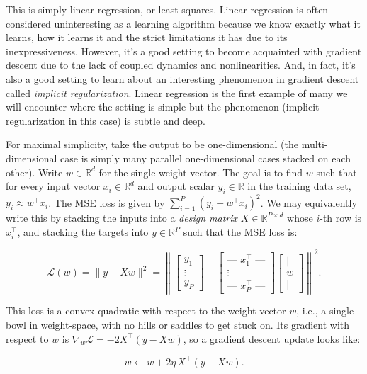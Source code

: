 This is simply linear regression, or least squares. Linear regression is often considered uninteresting as a learning algorithm because we know exactly what it learns, how it learns it and the strict limitations it has due to its inexpressiveness. However, it's a good setting to become acquainted with gradient descent due to the lack of coupled dynamics and nonlinearities. And, in fact, it's also a good setting to learn about an interesting phenomenon in gradient descent called \textit{implicit regularization}. Linear regression is the first example of many we will encounter where the setting is simple but the phenomenon (implicit regularization in this case) is subtle and deep.   

For maximal simplicity, take the output to be one-dimensional (the multi-dimensional case is simply many parallel one-dimensional cases stacked on each other). Write $w \in \mathbb{R}^d$ for the single weight vector. The goal is to find $w$ such that for every input vector $x_i\in\mathbb{R}^d$ and output scalar $y_i\in\mathbb{R}$ in the training data set, $y_i\approx w^\top x_i$. The MSE loss is given by $\sum^P_{i=1}(y_i-w^\top x_i)^2$. We may equivalently write this by stacking the inputs into a \textit{design matrix} $X \in \mathbb{R}^{P \times d}$ whose $i$-th row is $x_i^\top$, and stacking the targets into $y \in \mathbb{R}^P$ such that the MSE loss is:

$$
\mathcal{L}(w) = \|y - Xw\|^2 = \left\| 
\begin{bmatrix} y_1 \\ \vdots \\ y_P \end{bmatrix} -
\begin{bmatrix} \text{— } x^\top_1 \text{ —} \\ \vdots \\ \text{— } x^\top_P \text{ —} \end{bmatrix}
\begin{bmatrix} | \\ w \\ | \end{bmatrix}
\right\|^2.
$$

This loss is a convex quadratic with respect to the weight vector $w$, i.e., a single bowl in weight-space, with no hills or saddles to get stuck on. Its gradient with respect to $w$ is $\nabla_w \mathcal{L} = -2X^\top(y - Xw)$, so a gradient descent update looks like:

$$
w \leftarrow w + 2\eta\, X^\top(y - Xw).
$$

